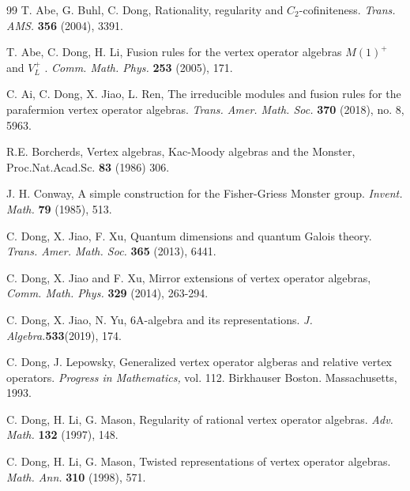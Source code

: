 \documentclass{article}
\begin{document}
\begin{thebibliography}{99}
 T. Abe, G. Buhl, C. Dong, Rationality, regularity
and $C_{2}$-cofiniteness. \emph{Trans. AMS.} \textbf{356} (2004),
3391.

 T. Abe, C. Dong, H. Li, Fusion rules for the vertex
operator algebras $M(1)^{+}$ and $V_{L}^{+}$ . \emph{Comm. Math.
	Phys.} \textbf{253} (2005), 171.

 C. Ai, C. Dong, X. Jiao, L. Ren, The irreducible
modules and fusion rules for the parafermion vertex operator algebras.
\emph{Trans. Amer. Math. Soc. }\textbf{370} (2018), no. 8, 5963.


 R.E. Borcherds,
Vertex algebras, Kac-Moody algebras and the Monster, 
Proc.Nat.Acad.Sc. \textbf{83} (1986) 306.

 J. H. Conway, A simple construction for the Fisher-Griess
Monster group. \emph{Invent. Math. }\textbf{79 }(1985), 513.


 C. Dong, X. Jiao, F. Xu, Quantum dimensions and
quantum Galois theory. \emph{Trans. Amer. Math. Soc.}\textbf{ 365}
(2013), 6441.

 C. Dong, X. Jiao and F. Xu, Mirror extensions of vertex operator algebras, {\em Comm. Math. Phys. } {\bf329} (2014), 263-294.

 C. Dong, X. Jiao, N. Yu, 6A-algebra and its representations.
\emph{J. Algebra.}\textbf{533}(2019), 174.

 C. Dong, J. Lepowsky, Generalized vertex operator
algberas and relative vertex operators. \emph{Progress in Mathematics,
}vol. 112. Birkhauser Boston. Massachusetts, 1993.

 C. Dong, H. Li, G. Mason, Regularity of rational
vertex operator algebras. \emph{Adv. Math.} \textbf{132} (1997), 148.

 C. Dong, H. Li, G. Mason, Twisted representations
of vertex operator algebras. \emph{Math. Ann. }\textbf{310 }(1998),\textbf{
}571.


\end{thebibliography}
\end{document}
